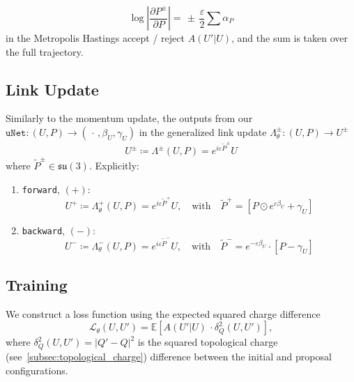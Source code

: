 \documentclass[a4paper,11pt]{article}
\begin{document}
\begin{equation}
    \log\left|\frac{\partial P^{\pm}}{\partial P}\right| = \, \pm \, \frac{\varepsilon}{2}\sum \alpha_{P}
\end{equation}
%
in the Metropolis Hastings accept / reject $A(U'|U)$, and the sum is taken over the full trajectory.
%
\subsection{\label{subsec:gauge-update}Link Update}
%
Similarly to the momentum update, the outputs from our $\texttt{uNet}: (U, P) \rightarrow \left(\, \cdot\,, \beta_{U}, \gamma_{U}\right)$ in the generalized link update $\Lambda^{\pm}_{\theta}: (U, P) \rightarrow U^{\pm}$
%
\begin{equation}
  U^{\pm} \coloneqq \Lambda^{\pm}(U, P) = e^{i\varepsilon \tilde{P}^{\pm}} U
\end{equation}
%
where $\tilde{P}^{\pm} \in \mathfrak{su(3)}$. Explicitly:
\begin{enumerate}
\item \texttt{forward}, $(+)$:
    \begin{equation}
        U^{+} \coloneqq \Lambda^{+}_{\theta}(U, P) = e^{i\varepsilon \tilde{P}^{+}} U, \quad \text{with}\quad \tilde{P}^{+} = \left[P\odot e^{\varepsilon \beta_{U}} + \gamma_{U}\right]
    \end{equation}
%
\item \texttt{backward}, $(-)$:
%
    \begin{equation}
        U^{-} \coloneqq \Lambda^{-}_{\theta}(U, P) = e^{i\varepsilon \tilde{P}^{-}} U, \quad \text{with}\quad \tilde{P}^{-} = e^{-\varepsilon \beta_{U}} \cdot \left[P - \gamma_{U} \right] 
    \end{equation}
%
\end{enumerate}
%
\subsection{\label{subsec:training}Training}
%
We construct a loss function using the expected squared charge
difference
%
\begin{equation}
    \mathcal{L}_{\theta}(U, U') = \mathbb{E}\left[A(U'|U)\,\cdot \delta^{2}_{Q}(U, U')\right],
\end{equation}
%
where $\delta^{2}_{Q}(U, U')= |Q' - Q|^{2}$ is the squared topological
charge (see~\ref{subsec:topological_charge}) difference between the initial and proposal configurations.
\end{document}
